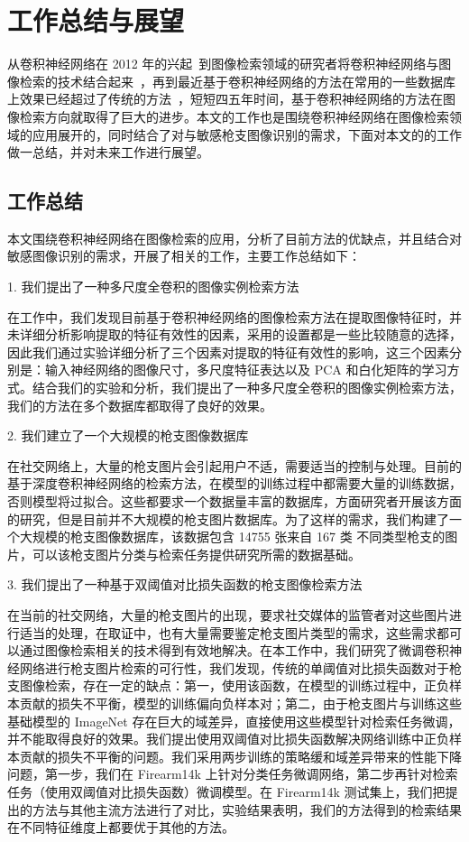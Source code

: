 
\chapter{工作总结与展望}
从卷积神经网络在 2012 年的兴起~\cite{Krizhevsky2012ImageNetCW}到图像检索领域的研究者将卷积神经网络与图像检索的技术结合起来~\cite{Babenko2014NeuralCF,Gong2014MultiscaleOP}，再到最近基于卷积神经网络的方法在常用的一些数据库上效果已经超过了传统的方法~\cite{Gordo2016DeepIR,Noh2017LargeScaleIR}，短短四五年时间，基于卷积神经网络的方法在图像检索方向就取得了巨大的进步。本文的工作也是围绕卷积神经网络在图像检索领域的应用展开的，同时结合了对与敏感枪支图像识别的需求，下面对本文的的工作做一总结，并对未来工作进行展望。

\section{工作总结}
本文围绕卷积神经网络在图像检索的应用，分析了目前方法的优缺点，并且结合对敏感图像识别的需求，开展了相关的工作，主要工作总结如下：

1. 我们提出了一种多尺度全卷积的图像实例检索方法

在工作中，我们发现目前基于卷积神经网络的图像检索方法在提取图像特征时，并未详细分析影响提取的特征有效性的因素，采用的设置都是一些比较随意的选择，因此我们通过实验详细分析了三个因素对提取的特征有效性的影响，这三个因素分别是：输入神经网络的图像尺寸，多尺度特征表达以及 PCA 和白化矩阵的学习方式。结合我们的实验和分析，我们提出了一种多尺度全卷积的图像实例检索方法，我们的方法在多个数据库都取得了良好的效果。

2. 我们建立了一个大规模的枪支图像数据库

在社交网络上，大量的枪支图片会引起用户不适，需要适当的控制与处理。目前的基于深度卷积神经网络的检索方法，在模型的训练过程中都需要大量的训练数据，否则模型将过拟合。这些都要求一个数据量丰富的数据库，方面研究者开展该方面的研究，但是目前并不大规模的枪支图片数据库。为了这样的需求，我们构建了一个大规模的枪支图像数据库，该数据包含 14755 张来自 167 类
不同类型枪支的图片，可以该枪支图片分类与检索任务提供研究所需的数据基础。

3. 我们提出了一种基于双阈值对比损失函数的枪支图像检索方法

在当前的社交网络，大量的枪支图片的出现，要求社交媒体的监管者对这些图片进行适当的处理，在取证中，也有大量需要鉴定枪支图片类型的需求，这些需求都可以通过图像检索相关的技术得到有效地解决。在本工作中，我们研究了微调卷积神经网络进行枪支图片检索的可行性，我们发现，传统的单阈值对比损失函数对于枪支图像检索，存在一定的缺点：第一，使用该函数，在模型的训练过程中，正负样本贡献的损失不平衡，模型的训练偏向负样本对；第二，由于枪支图片与训练这些基础模型的 ImageNet 存在巨大的域差异，直接使用这些模型针对检索任务微调，并不能取得良好的效果。我们提出使用双阈值对比损失函数解决网络训练中正负样本贡献的损失不平衡的问题。我们采用两步训练的策略缓和域差异带来的性能下降问题，第一步，我们在 Firearm14k 上针对分类任务微调网络，第二步再针对检索任务（使用双阈值对比损失函数）微调模型。在 Firearm14k 测试集上，我们把提出的方法与其他主流方法进行了对比，实验结果表明，我们的方法得到的检索结果在不同特征维度上都要优于其他的方法。

